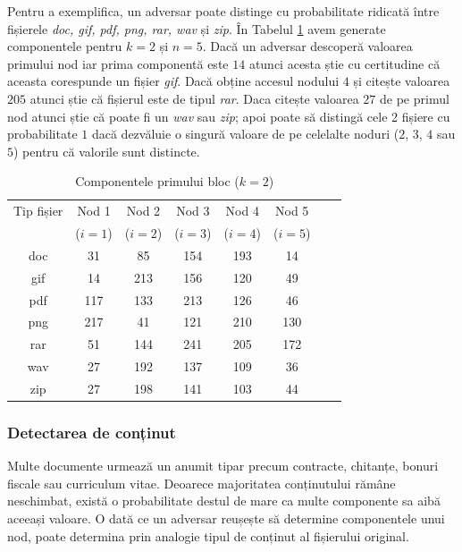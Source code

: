 \documentclass[oneside, 12pt]{book}
\begin{document}
Pentru a exemplifica, un adversar poate distinge cu probabilitate ridicată între fișierele \textit{doc, gif, pdf, png, rar, wav} și \textit{zip}. În Tabelul {\ref{table:shares}} avem generate componentele pentru $k = 2$ și $n = 5$.
Dacă un adversar descoperă valoarea primului nod iar prima componentă este $14$ atunci acesta știe cu certitudine că aceasta corespunde un fișier \textit{gif}. Dacă obține accesul nodului $4$ și citește valoarea $205$ atunci știe că fișierul este de tipul \textit{rar}. Daca citește valoarea $27$ de pe primul nod atunci știe că poate fi un \textit{wav} sau \textit{zip}; apoi poate să distingă cele 2 fișiere cu probabilitate $1$ dacă dezvăluie o singură valoare de pe celelalte noduri ($2$, $3$, $4$ sau $5$) pentru că valorile sunt distincte.


\begin{table}[t!]
\begin{center}
\caption{Componentele primului bloc ($k=2$)}\label{tb:margins}
\label{table:shares}
\begin{tabular}{cccccccc}
Tip fișier & Nod 1 & Nod 2 & Nod 3 & Nod 4 & Nod 5 \\
  & ($i=1$) & ($i=2$) & ($i=3$) & ($i=4$) & ($i=5$) \\
\hline
doc & 31 & 85 & 154 & 193 & 14 \\
gif & 14 & 213 & 156 & 120 & 49 \\
pdf & 117 & 133 & 213 & 126 & 46 \\
png & 217 & 41 & 121 & 210 & 130 \\ 
rar & 51 & 144 & 241 & 205 & 172  \\
wav & 27 & 192 & 137 & 109 & 36 \\
zip & 27 & 198 & 141 & 103 & 44 \\ \hline
\end{tabular}
\end{center}
\bigskip
\end{table}




\subsubsection{Detectarea de conținut}
\label{subsec:file_content_detection}

Multe documente urmează un anumit tipar precum contracte, chitanțe, bonuri fiscale sau curriculum vitae. Deoarece majoritatea conținutului rămâne neschimbat, există o probabilitate destul de mare ca multe componente sa aibă aceeași valoare. O dată ce un adversar reușește să determine componentele unui nod, poate determina prin analogie tipul de conținut al fișierului original.
\end{document}
